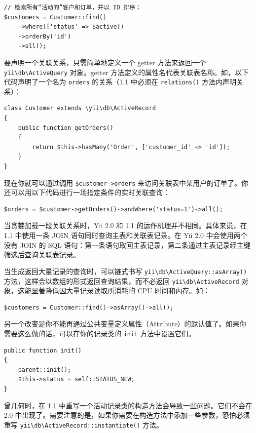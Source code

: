 \lstset{language=php}\begin{lstlisting}
// 检索所有“活动的”客户和订单，并以 ID 排序：
$customers = Customer::find()
    ->where(['status' => $active])
    ->orderBy('id')
    ->all();
\end{lstlisting}
要声明一个关联关系，只需简单地定义一个 getter 方法来返回一个 \texttt{yii{\allowbreak{}\textbackslash}db{\allowbreak{}\textbackslash}ActiveQuery} 对象。getter 方法定义的属性名代表关联表名称。如，以下代码声明了一个名为 \lstinline|orders| 的关系（1.1 中必须在 \lstinline|relations()| 方法内声明关系）：

\lstset{language=php}\begin{lstlisting}
class Customer extends \yii\db\ActiveRecord
{
    public function getOrders()
    {
        return $this->hasMany('Order', ['customer_id' => 'id']);
    }
}
\end{lstlisting}
现在你就可以通过调用 \lstinline|$customer->orders| 来访问关联表中某用户的订单了。你还可以用以下代码进行一场指定条件的实时关联查询：

\lstset{language=php}\begin{lstlisting}
$orders = $customer->getOrders()->andWhere('status=1')->all();
\end{lstlisting}
当贪婪加载一段关联关系时，Yii 2.0 和 1.1 的运作机理并不相同。具体来说，在 1.1 中使用一条 JOIN 语句同时查询主表和关联表记录。在 Yii 2.0 中会使用两个没有 JOIN 的 SQL 语句：第一条语句取回主表记录，第二条通过主表记录经主键筛选后查询关联表记录。

当生成返回大量记录的查询时，可以链式书写 \texttt{yii{\allowbreak{}\textbackslash}db{\allowbreak{}\textbackslash}ActiveQuery\allowbreak{}::\allowbreak{}asArray()} 方法，这样会以数组的形式返回查询结果，而不必返回
\texttt{yii{\allowbreak{}\textbackslash}db{\allowbreak{}\textbackslash}ActiveRecord} 对象，这能显著降低因大量记录读取所消耗的 CPU 时间和内存。如：

\lstset{language=php}\begin{lstlisting}
$customers = Customer::find()->asArray()->all();
\end{lstlisting}
另一个改变是你不能再通过公共变量定义属性（Attribute）的默认值了。如果你需要这么做的话，可以在你的记录类的 \lstinline|init| 方法中设置它们。

\lstset{language=php}\begin{lstlisting}
public function init()
{
    parent::init();
    $this->status = self::STATUS_NEW;
}
\end{lstlisting}
曾几何时，在 1.1 中重写一个活动记录类的构造方法会导致一些问题。它们不会在 2.0 中出现了。需要注意的是，如果你需要在构造方法中添加一些参数，恐怕必须重写 \texttt{yii{\allowbreak{}\textbackslash}db{\allowbreak{}\textbackslash}ActiveRecord\allowbreak{}::\allowbreak{}instantiate()} 方法。

